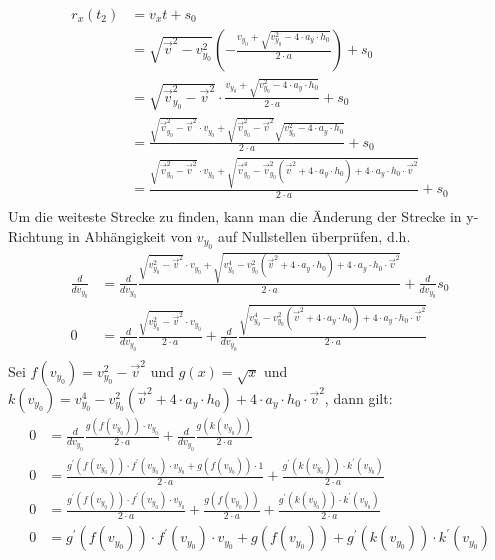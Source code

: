\documentclass[sectionformat = aufgabe]{gadsescript}
\begin{document}
\begin{enumerate}[label=\alph*)]
\begin{align*}
			r_x(t_2) &= v_xt + s_0\\
			~&= \sqrt{\vec v^2 - v_{y_0}^2} \left( - \frac{v_{y_0} + \sqrt{v_{y_0}^2 - 4\cdot a_y\cdot h_0}}{2\cdot a}\right) + s_0\\
			~&= \sqrt{\vec v_{y_0}^2 - \vec v^2 } \cdot \frac{v_{y_0} + \sqrt{v_{y_0}^2 - 4\cdot a_y\cdot h_0}}{2\cdot a} + s_0\\
			~&= \frac{\sqrt{\vec v_{y_0}^2 - \vec v^2 } \cdot v_{y_0} + \sqrt{\vec v_{y_0}^2 - \vec v^2 }\sqrt{v_{y_0}^2 - 4\cdot a_y\cdot h_0}}{2\cdot a} + s_0\\
			~&= \frac{\sqrt{\vec v_{y_0}^2 - \vec v^2 } \cdot v_{y_0} + \sqrt{\vec v_{y_0}^4 - \vec v_{y_0}^2 \left( \vec v^2 + 4 \cdot a_y \cdot h_0 \right) + 4\cdot a_y\cdot h_0 \cdot \vec v^2}}{2\cdot a} + s_0\\
		\end{align*}
		Um die weiteste Strecke zu finden, kann man die Änderung der Strecke in y-Richtung in Abhängigkeit von $ v_{y_0} $ auf Nullstellen überprüfen, d.h.
		\begin{align*}
			\frac{d}{dv_{y_0}} &= \frac{d}{dv_{y_0}}  \frac{\sqrt{v_{y_0}^2 - \vec v^2 } \cdot v_{y_0} + \sqrt{v_{y_0}^4 - v_{y_0}^2 \left( \vec v^2 + 4 \cdot a_y \cdot h_0 \right) + 4\cdot a_y\cdot h_0 \cdot \vec v^2}}{2\cdot a} + \frac{d}{dv_{y_0}}s_0\\
			0 &= \frac{d}{dv_{y_0}}  \frac{\sqrt{v_{y_0}^2 - \vec v^2 } \cdot v_{y_0}}{2\cdot a} + \frac{d}{dv_{y_0}}\frac{\sqrt{v_{y_0}^4 - v_{y_0}^2 \left( \vec v^2 + 4 \cdot a_y \cdot h_0 \right) + 4\cdot a_y\cdot h_0 \cdot \vec v^2}}{2\cdot a} \\
		\end{align*}
		Sei $ f(v_{y_0}) = v_{y_0}^2 - \vec v^2 $ und $ g(x) = \sqrt{x} $ und $ k(v_{y_0}) = {v_{y_0}^4 - v_{y_0}^2 \left( \vec v^2 + 4 \cdot a_y \cdot h_0 \right) + 4\cdot a_y\cdot h_0 \cdot \vec v^2} $, dann gilt:
		\begin{align*}
			0 &= \frac{d}{dv_{y_0}}  \frac{g(f(v_{y_0})) \cdot v_{y_0}}{2\cdot a} + \frac{d}{dv_{y_0}}\frac{g(k(v_{y_0})) }{2\cdot a} \\
			0 &=  \frac{g^\prime(f(v_{y_0}))\cdot f^\prime(v_{y_0}) \cdot v_{y_0} + g(f(v_{y_0})) \cdot 1}{2\cdot a} + \frac{g^\prime(k(v_{y_0}))\cdot k^\prime(v_{y_0}) }{2\cdot a} \\
			0 &=  \frac{g^\prime(f(v_{y_0}))\cdot f^\prime(v_{y_0}) \cdot v_{y_0}}{2\cdot a} + \frac{g(f(v_{y_0})) }{2\cdot a} + \frac{g^\prime(k(v_{y_0}))\cdot k^\prime(v_{y_0}) }{2\cdot a} \\
			0 &=  g^\prime(f(v_{y_0}))\cdot f^\prime(v_{y_0}) \cdot v_{y_0} + g(f(v_{y_0})) + g^\prime(k(v_{y_0}))\cdot k^\prime(v_{y_0})  \\

\end{align*}
\end{enumerate}
\end{document}
